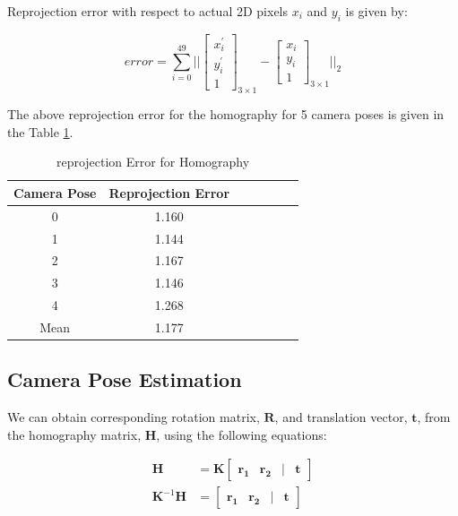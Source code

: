 \documentclass{article}
\begin{document}
Reprojection error with respect to actual 2D pixels $x_i$ and $y_i$ is given by:


\begin{equation}
    error = \sum_{i=0}^{49} || \begin{bmatrix} x_i^{'} \\ y_i^{'} \\ 1 \end{bmatrix}_{3 \times 1} - \begin{bmatrix} x_i \\ y_i \\ 1 \end{bmatrix}_{3 \times 1} ||_2
\end{equation}

The above reprojection error for the homography for 5 camera poses is given in the Table \ref{tab:reprojection_error_homography}.

\begin{table}[h]
    \centering
    \begin{tabular}{|c|c|c|c|c|c|c|}
        \hline
        Camera Pose & Reprojection Error \\
        \hline
        0 & 1.160 \\
        1 & 1.144 \\
        2 & 1.167 \\
        3 & 1.146 \\
        4 & 1.268 \\
        Mean & 1.177 \\
        \hline
    \end{tabular}
    \caption{reprojection Error for Homography}
    \label{tab:reprojection_error_homography}
\end{table}

\subsection{Camera Pose Estimation}
We can obtain corresponding rotation matrix, $\mathbf{R}$, and translation vector, $\mathbf{t}$, from the homography matrix, $\mathbf{H}$, using the following equations:

\begin{align}
    \mathbf{H} &= \mathbf{K} \begin{bmatrix} \mathbf{r_1} & \mathbf{r_2} & | & \mathbf{t} \end{bmatrix} \\
    \mathbf{K}^{-1} \mathbf{H} &= \begin{bmatrix} \mathbf{r_1} & \mathbf{r_2} & | & \mathbf{t} \end{bmatrix}
\end{align}
    
\end{document}
